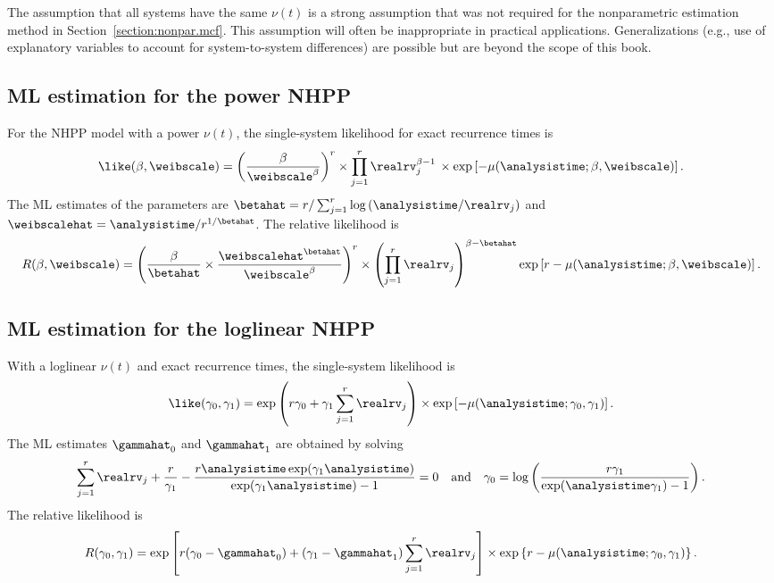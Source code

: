 The assumption that all systems have the same $\nu(t)$ is a strong
assumption that was not required for the nonparametric estimation
method in Section~\ref{section:nonpar.mcf}. This assumption will often be 
inappropriate in practical applications. Generalizations (e.g., use of
explanatory variables to account for system-to-system differences)
are possible but are beyond the scope of this book.

\subsection{ML estimation for the power NHPP}
\label{section:ml.power.nhpp}
For the NHPP model with a power $\nu(t)$, the single-system likelihood
for exact recurrence times is
\begin{displaymath}
\like(\beta, \weibscale)=
\left( \frac{\beta}{ \weibscale^{\beta}}\right)^{r} \times
\prod_{j=1}^{r} \realrv_{j}^{\beta-1} \,
\times
 \exp 
 \left [ -
\mu(\analysistime;\beta, \weibscale)
 \right ].
\end{displaymath}
The
ML estimates of the parameters are 
$\betahat=r/ \sum_{j=1}^{r}
    \log \left (\analysistime/\realrv_{j} \right )$
and $\weibscalehat=\analysistime/ r^{1/\betahat}$.
The relative likelihood is
\begin{displaymath}
R(\beta, \weibscale)=
\left (\frac{  \beta } { \betahat } \times
\frac{  \weibscalehat^{\betahat} } { \weibscale^{\beta} }\right )^{r}
\times \left ( \prod_{j=1}^{r} \realrv_{j}\right )^{\beta-\betahat}
\exp  \left [ r - \mu(\analysistime;\beta, \weibscale)
 \right ].
\end{displaymath}

\subsection{ML estimation for the loglinear NHPP} 
\label{section:ml.loglinear.nhpp}
With a loglinear $\nu(t)$ and exact recurrence times, the 
single-system likelihood is
\begin{displaymath}
\like(\gamma_{0},\gamma_{1})=
\exp \left (
r \gamma_{0} + \gamma_{1} \sum_{j=1}^{r} \realrv_{j} \right )
\times
\exp \left [
-
\mu(\analysistime;\gamma_{0}, \gamma_{1})
\right ].
\end{displaymath}
The ML estimates $\gammahat_{0}$ and $\gammahat_{1}$ 
are obtained by solving
\begin{displaymath}
\sum_{j=1}^{r} \realrv_{j}+ \frac{r}
				 {\gamma_{1}} -\frac{ r
\analysistime \exp (\gamma_{1} \analysistime) } {
\exp(\gamma_{1} \analysistime)-1 } =0
\quad {\rm and} \quad
\gamma_{0}
   =
\log \left (\frac{
   r \gamma_{1}
     }
     {
   \exp(\analysistime \gamma_{1}) -1
     }  \right ).
\end{displaymath}
The relative likelihood is
\begin{displaymath}
R(\gamma_{0},\gamma_{1})=
\exp \left [ r ( \gamma_{0}-\gammahat_{0})
+(\gamma_{1}-\gammahat_{1}) \sum_{j=1}^{r} \realrv_{j}
    \right ] \times
\exp \left \{r-\mu(\analysistime; \gamma_{0}, \gamma_{1}) \right \}.
\end{displaymath}

